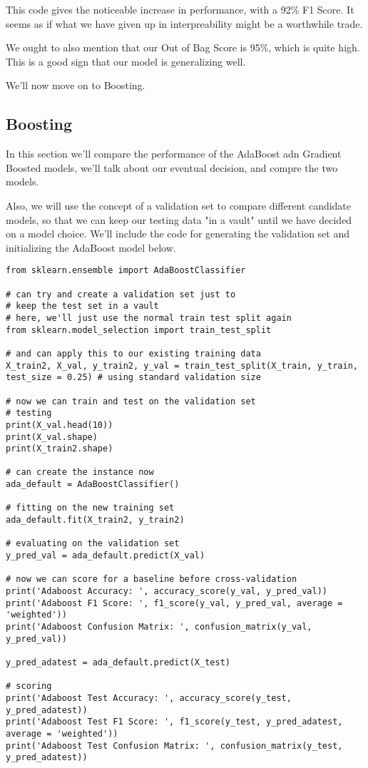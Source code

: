 \documentclass[12pt, letterpaper]{article}
\begin{document}
This code gives the noticeable increase in performance, with a 92\% F1 Score. It seems as if what we have given up in interpreability might be a worthwhile trade. 

We ought to also mention that our Out of Bag Score is 95\%, which is quite high. This is a good sign that our model is generalizing well. 

We'll now move on to Boosting. 

\subsection{Boosting}

In this section we'll compare the performance of the AdaBoost adn Gradient Boosted models, we'll talk about our eventual decision, and compre the two models. 

Also, we will use the concept of a validation set to compare different candidate models, so that we can keep our testing data "in a vault" until we have decided on a model choice. 
We'll include the code for generating the validation set and initializing the AdaBoost model below. 

\begin{verbatim}
from sklearn.ensemble import AdaBoostClassifier 

# can try and create a validation set just to 
# keep the test set in a vault 
# here, we'll just use the normal train test split again 
from sklearn.model_selection import train_test_split 

# and can apply this to our existing training data 
X_train2, X_val, y_train2, y_val = train_test_split(X_train, y_train, test_size = 0.25) # using standard validation size 

# now we can train and test on the validation set 
# testing 
print(X_val.head(10)) 
print(X_val.shape) 
print(X_train2.shape)

# can create the instance now 
ada_default = AdaBoostClassifier() 

# fitting on the new training set 
ada_default.fit(X_train2, y_train2) 

# evaluating on the validation set 
y_pred_val = ada_default.predict(X_val) 

# now we can score for a baseline before cross-validation 
print('Adaboost Accuracy: ', accuracy_score(y_val, y_pred_val)) 
print('Adaboost F1 Score: ', f1_score(y_val, y_pred_val, average = 'weighted')) 
print('Adaboost Confusion Matrix: ', confusion_matrix(y_val, y_pred_val))

y_pred_adatest = ada_default.predict(X_test) 

# scoring 
print('Adaboost Test Accuracy: ', accuracy_score(y_test, y_pred_adatest)) 
print('Adaboost Test F1 Score: ', f1_score(y_test, y_pred_adatest, average = 'weighted')) 
print('Adaboost Test Confusion Matrix: ', confusion_matrix(y_test, y_pred_adatest)) 
\end{verbatim}
\end{document}
